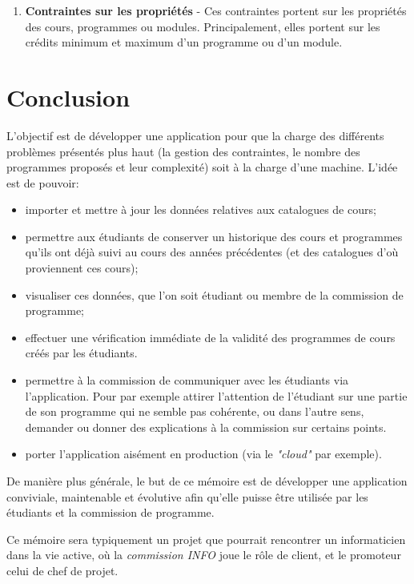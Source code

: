 \begin{enumerate}
\item \textbf{Contraintes sur les propriétés} - Ces contraintes portent sur les propriétés des cours, programmes ou modules. Principalement, elles portent sur les crédits minimum et maximum d'un programme ou d'un module.

\end{enumerate}


\section{Conclusion}
L'objectif est de développer une application pour que la charge des différents problèmes présentés plus haut (la gestion des contraintes, le nombre des programmes proposés et leur complexité) soit à la charge d'une machine. L'idée est de pouvoir:
\begin{itemize}
\item importer et mettre à jour les données relatives aux catalogues de cours;
\item permettre aux étudiants de conserver un historique des cours et programmes qu'ils ont déjà suivi au cours des années précédentes (et des catalogues d'où proviennent ces cours);
\item visualiser ces données, que l'on soit étudiant ou membre de la commission de programme;
\item effectuer une vérification immédiate de la validité des programmes de cours créés par les étudiants.


\item permettre à la commission de communiquer avec les étudiants via l'application. Pour par exemple attirer l'attention de l'étudiant sur une partie de son programme qui ne semble pas cohérente, ou dans l'autre sens, demander ou donner des explications à la commission sur certains points.
\item porter l'application aisément en production (via le \textit{"cloud"} par exemple). 
\end{itemize}

De manière plus générale, le but de ce mémoire est de développer une application conviviale, maintenable et évolutive afin qu'elle puisse être utilisée par les étudiants et la commission de programme. 

Ce mémoire sera typiquement un projet que pourrait rencontrer un informaticien dans la vie active, où la \textit{commission INFO} joue le rôle de client, et le promoteur celui de chef de projet. 